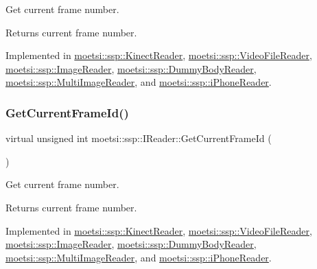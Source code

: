 Get current frame number. 

\begin{DoxyReturn}{Returns}
current frame number. 
\end{DoxyReturn}


Implemented in \hyperlink{classmoetsi_1_1ssp_1_1KinectReader_aa17e268723c41bdad5082575decb28eb}{moetsi\+::ssp\+::\+Kinect\+Reader}, \hyperlink{classmoetsi_1_1ssp_1_1VideoFileReader_aef5c92da2645cddc7e4ffcfd34ad4b8a}{moetsi\+::ssp\+::\+Video\+File\+Reader}, \hyperlink{classmoetsi_1_1ssp_1_1ImageReader_a386125736df9f25e5c4312bb679ff031}{moetsi\+::ssp\+::\+Image\+Reader}, \hyperlink{classmoetsi_1_1ssp_1_1DummyBodyReader_a91d5b81c241103ffde276d354a34d7db}{moetsi\+::ssp\+::\+Dummy\+Body\+Reader}, \hyperlink{classmoetsi_1_1ssp_1_1MultiImageReader_a994eea20e9682c2f4afc9303a34c76f3}{moetsi\+::ssp\+::\+Multi\+Image\+Reader}, and \hyperlink{classmoetsi_1_1ssp_1_1iPhoneReader_a78792c6319743aed3ef2afc96fe16485}{moetsi\+::ssp\+::i\+Phone\+Reader}.

\mbox{\label{classmoetsi_1_1ssp_1_1IReader_ac292d83eb06dee277baaa06e281a562d}} 
\subsubsection{\texorpdfstring{Get\+Current\+Frame\+Id()}{GetCurrentFrameId()}\hspace{0.1cm}{\footnotesize\ttfamily [2/2]}}
{\footnotesize\ttfamily virtual unsigned int moetsi\+::ssp\+::\+I\+Reader\+::\+Get\+Current\+Frame\+Id (\begin{DoxyParamCaption}{ }\end{DoxyParamCaption})\hspace{0.3cm}{\ttfamily [pure virtual]}}



Get current frame number. 

\begin{DoxyReturn}{Returns}
current frame number. 
\end{DoxyReturn}


Implemented in \hyperlink{classmoetsi_1_1ssp_1_1KinectReader_aa17e268723c41bdad5082575decb28eb}{moetsi\+::ssp\+::\+Kinect\+Reader}, \hyperlink{classmoetsi_1_1ssp_1_1VideoFileReader_aef5c92da2645cddc7e4ffcfd34ad4b8a}{moetsi\+::ssp\+::\+Video\+File\+Reader}, \hyperlink{classmoetsi_1_1ssp_1_1ImageReader_a386125736df9f25e5c4312bb679ff031}{moetsi\+::ssp\+::\+Image\+Reader}, \hyperlink{classmoetsi_1_1ssp_1_1DummyBodyReader_a91d5b81c241103ffde276d354a34d7db}{moetsi\+::ssp\+::\+Dummy\+Body\+Reader}, \hyperlink{classmoetsi_1_1ssp_1_1MultiImageReader_a994eea20e9682c2f4afc9303a34c76f3}{moetsi\+::ssp\+::\+Multi\+Image\+Reader}, and \hyperlink{classmoetsi_1_1ssp_1_1iPhoneReader_a78792c6319743aed3ef2afc96fe16485}{moetsi\+::ssp\+::i\+Phone\+Reader}.

